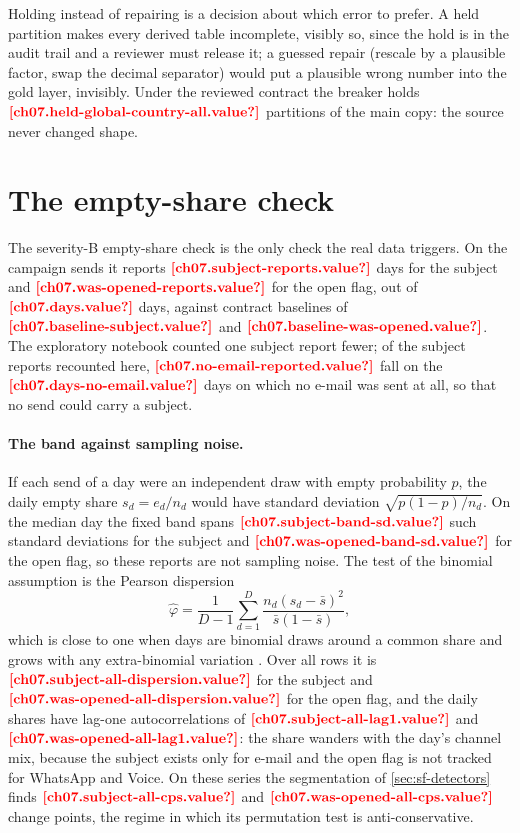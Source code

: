 Holding instead of repairing is a decision about which error to prefer. A held partition makes every derived table
incomplete, visibly so, since the hold is in the audit trail and a reviewer must release it; a guessed repair (rescale by
a plausible factor, swap the decimal separator) would put a plausible wrong number into the gold layer, invisibly. Under the
reviewed contract the breaker holds $\est{ch07.held-global-country-all}{value}$ partitions of the main copy: the source
never changed shape.

\section{The empty-share check}\label{sec:sf-empty}

The severity-B empty-share check is the only check the real data triggers. On the campaign sends it reports
$\est{ch07.subject-reports}{value}$ days for the subject and $\est{ch07.was-opened-reports}{value}$ for the open flag,
out of $\est{ch07.days}{value}$ days, against contract baselines of $\est{ch07.baseline-subject}{value}$ and
$\est{ch07.baseline-was-opened}{value}$. The exploratory notebook counted one subject report fewer; of the subject
reports recounted here, $\est{ch07.no-email-reported}{value}$ fall on the $\est{ch07.days-no-email}{value}$ days on which
no e-mail was sent at all, so that no send could carry a subject.

\paragraph{The band against sampling noise.} If each send of a day were an independent draw with empty probability $p$,
the daily empty share $s_d = e_d / n_d$ would have standard deviation $\sqrt{p(1-p)/n_d}$. On the median day the fixed
band spans $\est{ch07.subject-band-sd}{value}$ such standard deviations for the subject and
$\est{ch07.was-opened-band-sd}{value}$ for the open flag, so these reports are not sampling noise. The test of the
binomial assumption is the Pearson dispersion
\begin{equation}\label{eq:sf-dispersion}
  \hat\varphi = \frac{1}{D - 1} \sum_{d=1}^{D} \frac{n_d (s_d - \bar s)^2}{\bar s (1 - \bar s)},
\end{equation}
which is close to one when days are binomial draws around a common share and grows with any extra-binomial variation
\autocite{cochran1954,mccullagh1989}. Over all rows it is $\est{ch07.subject-all-dispersion}{value}$ for the subject and
$\est{ch07.was-opened-all-dispersion}{value}$ for the open flag, and the daily shares have lag-one autocorrelations of
$\est{ch07.subject-all-lag1}{value}$ and $\est{ch07.was-opened-all-lag1}{value}$: the share wanders with the day's
channel mix, because the subject exists only for e-mail and the open flag is not tracked for WhatsApp and Voice. On these
series the segmentation of \cref{sec:sf-detectors} finds $\est{ch07.subject-all-cps}{value}$ and
$\est{ch07.was-opened-all-cps}{value}$ change points, the regime in which its permutation test is anti-conservative.


